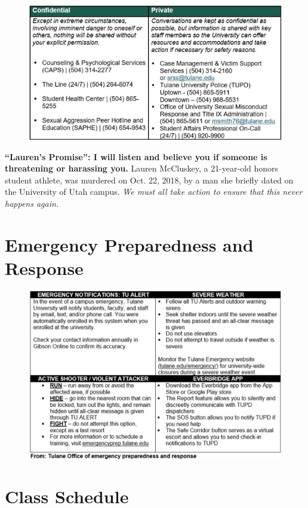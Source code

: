 \documentclass[11pt,letterpaper,final]{article}
\begin{document}
\begin{figure}[H]
\centering
\includegraphics[width=1.0\textwidth]{TulaneTitleIX.jpg}
\end{figure}

\textbf{``Lauren's Promise'': I will listen and believe you if someone is threatening or harassing you.} Lauren McCluskey, a 21-year-old honors student athlete, was murdered on Oct. 22, 2018, by a man she briefly dated on the University of Utah campus. \textit{We must all take action to ensure that this never happens again.}

\section{Emergency Preparedness and Response}

\begin{figure}[H]
\centering
\includegraphics[width=1.0\textwidth]{TulaneEmergency2.jpg}
\end{figure}

\section{Class Schedule}
\end{document}
